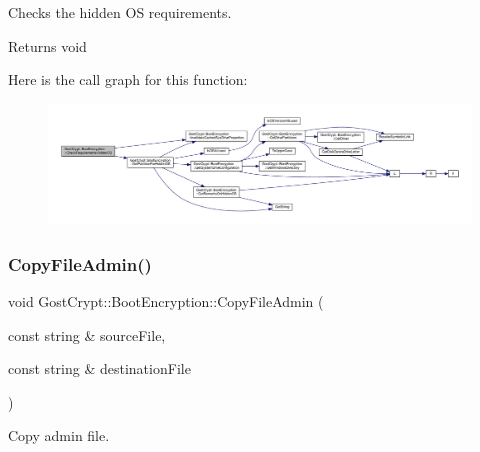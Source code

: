 Checks the hidden OS requirements. 

\begin{DoxyReturn}{Returns}
void 
\end{DoxyReturn}
Here is the call graph for this function\+:
\nopagebreak
\begin{figure}[H]
\begin{center}
\leavevmode
\includegraphics[width=350pt]{class_gost_crypt_1_1_boot_encryption_af8f44624d785fff7ce9e8078d71f03a6_cgraph}
\end{center}
\end{figure}
\mbox{\label{class_gost_crypt_1_1_boot_encryption_af19de97081ce528cd89df39393469b7c}} 
\subsubsection{\texorpdfstring{Copy\+File\+Admin()}{CopyFileAdmin()}}
{\footnotesize\ttfamily void Gost\+Crypt\+::\+Boot\+Encryption\+::\+Copy\+File\+Admin (\begin{DoxyParamCaption}\item[{const string \&}]{source\+File,  }\item[{const string \&}]{destination\+File }\end{DoxyParamCaption})}



Copy admin file. 


